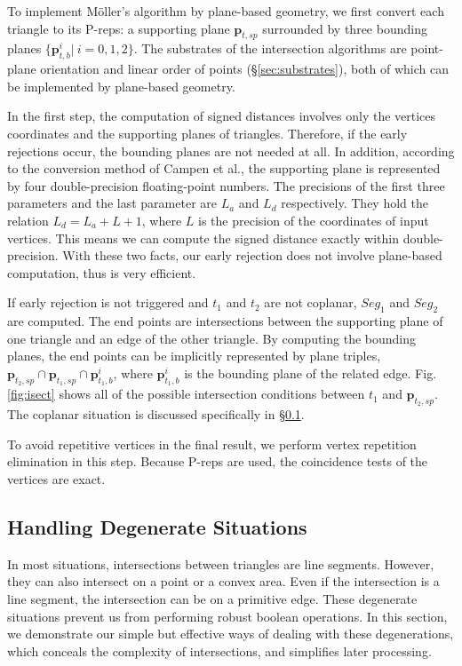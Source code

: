 To implement M\"{o}ller's algorithm by plane-based geometry, we first convert each triangle to its P-reps: a supporting plane $\bm{p}_{t, sp}$  surrounded by three bounding planes $\{\bm{p}_{t, b}^i|\ i = 0,1,2\}$. The substrates of the intersection algorithms are point-plane orientation \cite{bernstein2009fast} and linear order of points (\S\ref{sec:substrates}), both of which can be implemented by plane-based geometry.

In the first step, the computation of signed distances involves only the vertices coordinates and the supporting planes of triangles. Therefore, if the early rejections occur, the bounding planes are not needed at all. In addition, according to the conversion method of Campen et al.\cite{campen2010exact}, the supporting plane is represented by four double-precision floating-point numbers. The precisions of the first three parameters and the last parameter are $L_a$ and $L_d$ respectively. They hold the relation $L_d = L_a + L + 1$, where $L$ is the precision of the coordinates of input vertices. This means we can compute the signed distance exactly within double-precision. With these two facts, our early rejection does not involve plane-based computation, thus is very efficient.

If early rejection is not triggered and $t_1$ and $t_2$ are not coplanar, $Seg_1$ and $Seg_2$ are computed. The end points are intersections between the supporting plane of one triangle and an edge of the other triangle. By computing the bounding planes, the end points can be implicitly represented by plane triples, $\bm{p}_{t_2, sp} \cap \bm{p}_{t_1, sp} \cap \bm{p}^i_{t_1, b}$, where $\bm{p}^i_{t_1, b}$ is the bounding plane of the related edge.
Fig. \ref{fig:isect} shows all of the possible intersection conditions between $t_1$ and $\bm{p}_{t_2, sp}$. The coplanar situation is discussed specifically in \S \ref{sec:degenerate}.

To avoid repetitive vertices in the final result, we perform vertex repetition elimination in this step. Because P-reps are used, the coincidence tests of the vertices are exact.



\subsection{Handling Degenerate Situations }
\label{sec:degenerate}

In most situations, intersections between triangles are line segments. However, they can also intersect on a point or a convex area. Even if the intersection is a line segment, the intersection can be on a primitive edge. These degenerate situations prevent us from performing robust boolean operations. In this section, we demonstrate our simple but effective ways of dealing with these degenerations, which conceals the complexity of intersections, and simplifies later processing.


